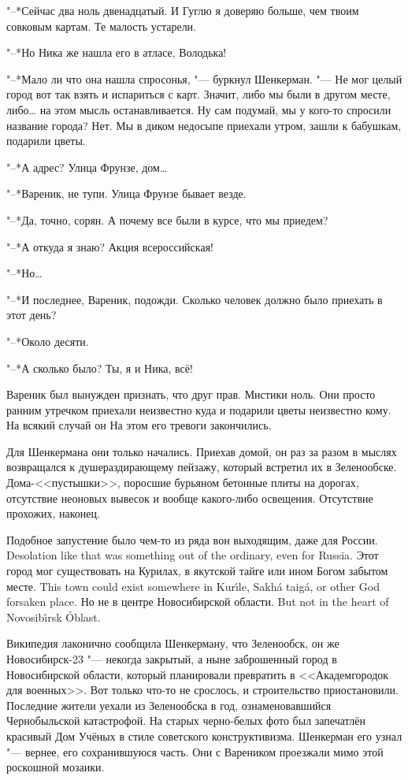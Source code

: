 "--*Сейчас два ноль двенадцатый.
И Гуглю я доверяю больше, чем твоим совковым картам.
Те малость устарели.

"--*Но Ника же нашла его в атласе, Володька!

"--*Мало ли что она нашла спросонья, "--- буркнул Шенкерман.
"--- Не мог целый город вот так взять и испариться с карт.
Значит, либо мы были в другом месте, либо\ldots{} на этом мысль останавливается.
Ну сам подумай, мы у кого-то спросили название города?
Нет.
Мы в диком недосыпе приехали утром, зашли к бабушкам, подарили цветы.

"--*А адрес?
Улица Фрунзе, дом\ldots{}

"--*Вареник, не тупи.
Улица Фрунзе бывает везде.

"--*Да, точно, сорян.
А почему все были в курсе, что мы приедем?

"--*А откуда я знаю?
Акция всероссийская!

"--*Но\ldots{}

"--*И последнее, Вареник, подожди.
Сколько человек должно было приехать в этот день?

"--*Около десяти.

"--*А сколько было?
Ты, я и Ника, всё!

Вареник был вынужден признать, что друг прав.
Мистики ноль.
Они просто ранним утречком приехали неизвестно куда и подарили цветы неизвестно кому.
На всякий случай он
На этом его тревоги закончились.

Для Шенкермана они только начались.
Приехав домой, он раз за разом в мыслях возвращался к душераздирающему пейзажу, который встретил их в Зеленообске.
Дома-<<пустышки>>, поросшие бурьяном бетонные плиты на дорогах, отсутствие неоновых вывесок и вообще какого-либо освещения.
Отсутствие прохожих, наконец.

{Подобное запустение было чем-то из ряда вон выходящим, даже для России.}
{Desolation like that was something out of the ordinary, even for Russia.}
{Этот город мог существовать на Курилах, в якутской тайге или ином Богом забытом месте.}
{This town could exist somewhere in Kur\'{\i}le, Sakh\'a taig\'a, or other God forsaken place.}
{Но не в центре Новосибирской области.}
{But not in the heart of Novosib\'{\i}rsk \'Oblast.}

Википедия лаконично сообщила Шенкерману, что Зеленообск, он же Новосибирск-23 "--- некогда закрытый, а ныне заброшенный город в Новосибирской области, который планировали превратить в <<Академгородок для военных>>.
Вот только что-то не срослось, и строительство приостановили.
Последние жители уехали из Зеленообска в год, ознаменовавшийся Чернобыльской катастрофой.
На старых черно-белых фото был запечатлён красивый Дом Учёных в стиле советского конструктивизма.
Шенкерман его узнал "--- вернее, его сохранившуюся часть.
Они с Вареником проезжали мимо этой роскошной мозаики.

